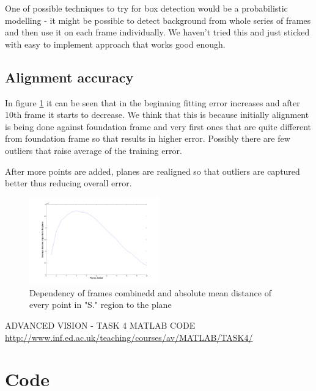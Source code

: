 \documentclass[12pt,a4paper,onecolumn]{article}
\begin{document}
One of possible techniques to try for box detection
would be a probabilistic modelling - it might be possible
to detect background from whole series of frames
and then use it on each frame individually. 
We haven't tried this and just sticked with
easy to implement approach that works good enough.


\subsection{Alignment accuracy}
In figure \ref{fig:plane_angle_error_versus_foundation_plane} it
can be seen that in the beginning fitting error increases and
after 10th frame it starts to decrease. We think that this is because
initially alignment is being done against foundation frame and
very first ones that are quite different from foundation frame
so that results in higher error. Possibly there are few outliers
that raise average of the training error.

After more points are added, planes are realigned so that outliers
are captured better thus reducing overall error.
\begin{figure}[h]
  \centering
  \includegraphics[width=0.5\textwidth]{figs/plane_angle_error_versus_foundation_plane}
  \caption{Dependency of frames combinedd and absolute mean distance of every point in "S." region to the plane}
  \label{fig:plane_angle_error_versus_foundation_plane}
\end{figure}

\begin{thebibliography}{9}
  
  ADVANCED VISION - TASK 4 MATLAB CODE
  \url{http://www.inf.ed.ac.uk/teaching/courses/av/MATLAB/TASK4/} 
  
\end{thebibliography}

\appendix


\newpage



\newpage


\section{Code}
\label{apen:code_in}
\end{document}
